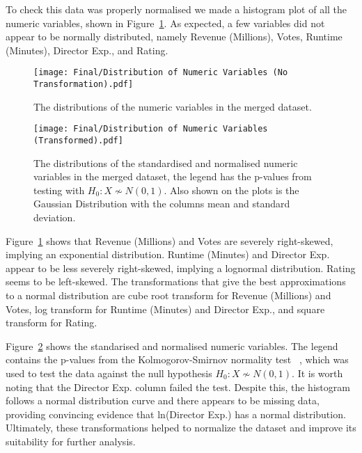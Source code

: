     \begin{multicols}{2}
        To check this data was properly normalised we made a histogram plot of all the
            numeric variables, shown in Figure~\ref{fig-distribution-of-numeric-variable}.
        As expected, a few variables did not appear to be normally distributed, namely
            Revenue (Millions), Votes, Runtime (Minutes), Director Exp., and Rating.
        \begin{figure}[H]
            \centering
            \texttt{[image: Final/Distribution of Numeric Variables (No Transformation).pdf]}
            \caption{The distributions of the numeric variables in the merged dataset.}\label{fig-distribution-of-numeric-variable}
        \end{figure}
        \begin{figure}[H]
            \centering
            \texttt{[image: Final/Distribution of Numeric Variables (Transformed).pdf]}
            \caption{The distributions of the standardised and normalised numeric variables
                in the merged dataset, the legend has the p-values from testing with
                $H_{0}: X \not\sim N(0,1)$.
                Also shown on the plots is the Gaussian Distribution with the columns mean and
                    standard deviation.
            }\label{fig-transformed-distribution-of-numeric-variable}
        \end{figure}
        Figure~\ref{fig-distribution-of-numeric-variable} shows that Revenue (Millions)
            and Votes are severely right-skewed, implying an exponential distribution.
        Runtime (Minutes) and Director Exp.
        appear to be less severely right-skewed,
        implying a lognormal distribution.
        Rating seems to be left-skewed.
        The transformations that give the best approximations to a normal distribution
            are cube root transform for Revenue (Millions) and Votes, log transform for
            Runtime (Minutes) and Director Exp., and square transform for Rating.

        Figure~\ref{fig-transformed-distribution-of-numeric-variable} shows the
            standarised and normalised numeric variables.
        The legend contains the p-values from the Kolmogorov-Smirnov normality test
            ~\cite{KStest}, which was used to test the data against the null hypothesis
            $H_{0}: X \not\sim N(0,1)$.
        It is worth noting that the Director Exp.
        column failed the test.
        Despite this, the histogram follows a normal distribution curve and there
            appears to be missing data, providing convincing evidence that ln(Director
            Exp.)
        has a normal distribution.
        Ultimately, these transformations helped to normalize the dataset and improve
            its suitability for further analysis.


\end{multicols}
